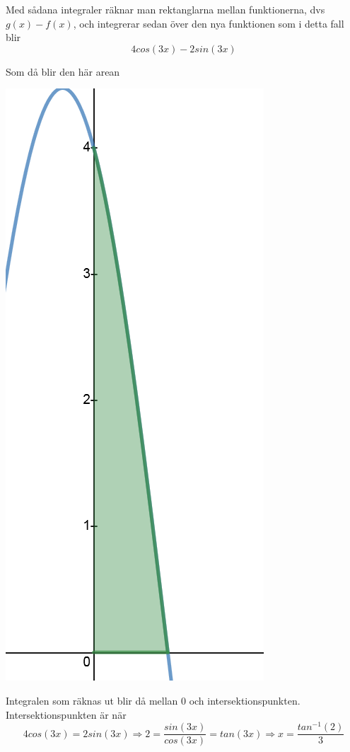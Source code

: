\documentclass[a4paper,12pt]{article}
\begin{document}
\begin{enumerate}
    Med sådana integraler räknar man rektanglarna mellan funktionerna, dvs
    $g(x)-f(x)$, och integrerar sedan över den nya funktionen som i detta
    fall blir $$4cos(3x)-2sin(3x)$$

    Som då blir den här arean
    \begin{center}
        \includegraphics[scale=0.4]{Figur 4.png}
    \end{center}

    Integralen som räknas ut blir då mellan 0 och intersektionspunkten.
    Intersektionspunkten är när 
    $$4cos(3x)=2sin(3x)\Rightarrow 2=\frac{sin(3x)}{cos(3x)}=tan(3x)\Rightarrow x=\frac{tan^{-1}(2)}{3}$$
    

\end{enumerate}
\end{document}
